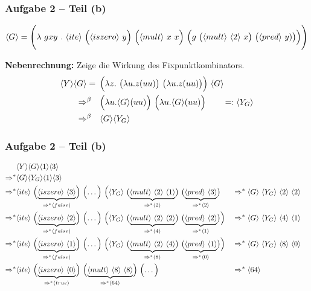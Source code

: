 \documentclass{beamer}
\newcommand{\num}[1]{\ensuremath{\langle #1 \rangle}}
\begin{document}
\begin{frame} \frametitle{Aufgabe 2 -- Teil (b)}
	\footnotesize
	\begin{equation*}
		\num{G} = \Biggl( \lambda \ g xy \ . \ \num{ite} \ \Bigl(\num{iszero} \ y \Bigr) \ \Bigl( \num{mult} \ x \ x \Bigr) \ \Bigl( g \ \bigl( \num{mult} \ \num{2} \ x \bigr) \ \bigl(\num{pred} \ y) \bigr) \Bigr) \Biggr)
	\end{equation*}
	
	\bigskip 
	\normalsize
	
	\textbf{Nebenrechnung:} Zeige die Wirkung des Fixpunktkombinators.
	\begin{align*}
		\num{Y} \num{G}
		= \enskip &\Bigl( \lambda z . \ \bigl( \lambda u . z (uu) \bigr) \ \bigl( \lambda u. z (uu) \bigr) \Bigr) \ \num{G} \\
		\Rightarrow^{\beta} \quad &\Bigl( \lambda u . \num{G} (uu) \Bigr) \ \Bigl( \lambda u. \num{G} (uu) \Bigr) \qquad =: \num{Y_G} \\
		\Rightarrow^{\beta} \quad &\num{G} \num{Y_G}
	\end{align*}
\end{frame}

\begin{frame} \frametitle{Aufgabe 2 -- Teil (b)}
	\scriptsize
	\begin{alignat*}{2}
	&\num{Y} \num{G} \num{1} \num{3} \\
	\Rightarrow^\ast &\num{G} \num{Y_G} \num{1} \num{3} \\
	\Rightarrow^\ast 
	&\num{ite} \ 
	\Bigl( \underbrace{\num{iszero} \ \num{3}}_{\Rightarrow^\ast \num{false}} \Bigr) \ \Bigl( \dots \Bigr) \ \Bigl( \num{Y_G} \ \bigl( \underbrace{\num{mult} \ \num{2} \ \num{1}}_{\Rightarrow^\ast \num{2}} \bigr) \ \bigl(\underbrace{\num{pred} \ \num{3}}_{\Rightarrow^\ast \num{2}} \bigr) 
	&&\Rightarrow^\ast 
	\num{G} \ \num{Y_G} \ \num{2} \ \num{2} \\
	\Rightarrow^\ast 
	&\num{ite} \ 
	\Bigl( \underbrace{\num{iszero} \ \num{2}}_{\Rightarrow^\ast \num{false}} \Bigr) \ \Bigl( \dots \Bigr) \ \Bigl( \num{Y_G} \ \bigl( \underbrace{\num{mult} \ \num{2} \ \num{2}}_{\Rightarrow^\ast \num{4}} \bigr) \ \bigl(\underbrace{\num{pred} \ \num{2}}_{\Rightarrow^\ast \num{1}} \bigr) \Bigr)
	&&\Rightarrow^\ast 
	\num{G} \ \num{Y_G} \ \num{4} \ \num{1} \\
	\Rightarrow^\ast 
	&\num{ite} \ 
	\Bigl( \underbrace{\num{iszero} \ \num{1}}_{\Rightarrow^\ast \num{false}} \Bigr) \ \Bigl( \dots \Bigr) \ \Bigl( \num{Y_G} \ \bigl( \underbrace{\num{mult} \ \num{2} \ \num{4}}_{\Rightarrow^\ast \num{8}} \bigr) \ \bigl(\underbrace{\num{pred} \ \num{1}}_{\Rightarrow^\ast \num{0}} \bigr) \Bigr)
	&&\Rightarrow^\ast
	\num{G} \ \num{Y_G} \ \num{8} \ \num{0} \\
	\Rightarrow^\ast
	&\num{ite} \ 
	\Bigl( \underbrace{\num{iszero} \ \num{0}}_{\Rightarrow^\ast \num{true}} \Bigr) \ \Bigl( \underbrace{\num{mult} \ \num{8} \ \num{8}}_{\Rightarrow^\ast \num{64}} \Bigr) \ \Bigl( \dots \Bigr)
	&&\Rightarrow^\ast \num{64}
	\end{alignat*}
\end{frame}	
\end{document}
